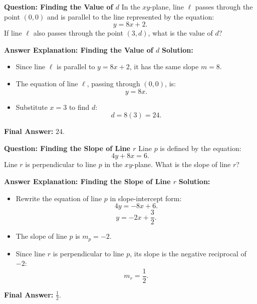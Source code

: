\documentclass{beamer}
\begin{document}
\begin{frame}{\textbf{Question: Finding the Value of \( d \)}}
    In the \( xy \)-plane, line \( \ell \) passes through the point \( (0,0) \) and is parallel to the line represented by the equation:
    \[
    y = 8x + 2.
    \]
    If line \( \ell \) also passes through the point \( (3,d) \), what is the value of \( d \)?
\end{frame}

\begin{frame}{\textbf{Answer Explanation: Finding the Value of \( d \)}}
    \textbf{Solution:}
    \begin{itemize}
        \item Since line \( \ell \) is parallel to \( y = 8x + 2 \), it has the same slope \( m = 8 \).
        \item The equation of line \( \ell \), passing through \( (0,0) \), is:
        \[
        y = 8x.
        \]
        \item Substitute \( x = 3 \) to find \( d \):
        \[
        d = 8(3) = 24.
        \]
    \end{itemize}
    \textbf{Final Answer:} \( \boxed{24} \).
\end{frame}

\begin{frame}{\textbf{Question: Finding the Slope of Line \( r \)}}
    Line \( p \) is defined by the equation:
    \[
    4y + 8x = 6.
    \]
    Line \( r \) is perpendicular to line \( p \) in the \( xy \)-plane.  
    What is the slope of line \( r \)?
\end{frame}

\begin{frame}{\textbf{Answer Explanation: Finding the Slope of Line \( r \)}}
    \textbf{Solution:}
    \begin{itemize}
        \item Rewrite the equation of line \( p \) in slope-intercept form:
        \[
        4y = -8x + 6.
        \]
        \[
        y = -2x + \frac{3}{2}.
        \]
        \item The slope of line \( p \) is \( m_p = -2 \).
        \item Since line \( r \) is perpendicular to line \( p \), its slope is the negative reciprocal of \( -2 \):
        \[
        m_r = \frac{1}{2}.
        \]
    \end{itemize}
    \textbf{Final Answer:} \( \boxed{\frac{1}{2}} \).
\end{frame}
\end{document}
